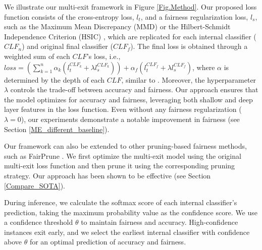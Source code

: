 We illustrate our multi-exit framework in Figure \ref{Fig.Method}. Our proposed loss function consists of the cross-entropy loss, $l_t$, and a fairness regularization loss, $l_s$, such as the Maximum Mean Discrepancy (MMD) \cite{jung2021fair} or the Hilbert-Schmidt Independence Criterion (HSIC) \cite{quadrianto2019discovering}, which are replicated for each internal classifier ($CLF_n$) and original final classifier ($CLF_f$). The final loss is obtained through a weighted sum of each $CLF$'s loss, i.e., $loss = (\sum_{k=1}^{n} \alpha _{k}(l_{t}^{CLF_{k}} + \lambda l_{s}^{CLF_{k}})) + \alpha _{f}(l_{t}^{CLF_{f}} + \lambda l_{s}^{CLF_{f}})$, where $\alpha$ is determined by the depth of each $CLF$, similar to \cite{kaya2019shallow,lee2015deeply}. Moreover, the hyperparameter $\lambda$ controls the trade-off between accuracy and fairness. Our approach ensures that the model optimizes for accuracy and fairness, leveraging both shallow and deep layer features in the loss function. Even without any fairness regularization ($\lambda=0$), our experiments demonstrate a notable improvement in fairness (see Section \ref{ME_different_baseline}). 

Our framework can also be extended to other pruning-based fairness methods, such as FairPrune \cite{wu2022fairprune}. We first optimize the multi-exit model using the original multi-exit loss function and then prune it using the corresponding pruning strategy. Our approach has been shown to be effective (see Section \ref{Compare_SOTA}).

During inference, we calculate the softmax score of each internal classifier’s prediction, taking the maximum probability value as the confidence score. We use a confidence threshold $\theta$ to maintain fairness and accuracy. High-confidence instances exit early, and we select the earliest internal classifier with confidence above $\theta$ for an optimal prediction of accuracy and fairness.



